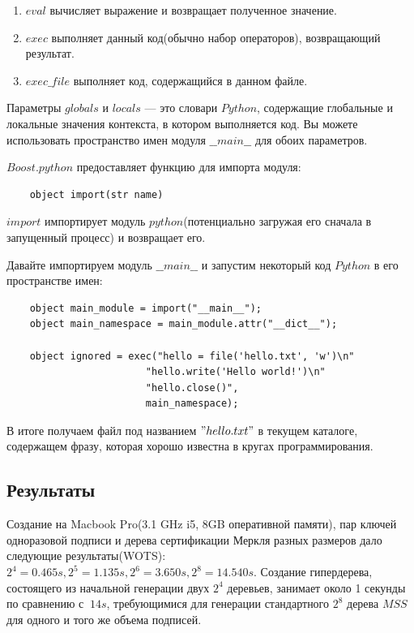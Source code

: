 \documentclass[a4paper, 14pt]{extarticle}
\begin{document}
\begin{enumerate}
    \item $eval$ вычисляет выражение и возвращает полученное значение.
    \item $exec$ выполняет данный код(обычно набор операторов), возвращающий результат.
    \item $exec\_file$ выполняет код, содержащийся в данном файле.
\end{enumerate}

Параметры $globals$ и $locals$ --- это словари $Python$, содержащие глобальные и локальные значения контекста, в котором выполняется код. Вы можете использовать пространство имен модуля $\_\_main\_\_$ для обоих параметров.

$Boost.python$ предоставляет функцию для импорта модуля:
\begin{verbatim}
    object import(str name)
\end{verbatim}

$import$ импортирует модуль $python$(потенциально загружая его сначала в запущенный процесс) и возвращает его.

Давайте импортируем модуль $\_\_main\_\_$ и запустим некоторый код $Python$ в его пространстве имен:

\begin{verbatim}
    object main_module = import("__main__");
    object main_namespace = main_module.attr("__dict__");

    object ignored = exec("hello = file('hello.txt', 'w')\n"
                        "hello.write('Hello world!')\n"
                        "hello.close()",
                        main_namespace);
\end{verbatim}

В итоге получаем файл под названием $"hello.txt"$ в текущем каталоге, содержащем фразу, которая хорошо известна в кругах программирования.

\subsection{Результаты}
Создание на Macbook Pro(3.1 GHz i5, 8GB оперативной памяти), пар ключей одноразовой подписи и дерева сертификации Меркля разных размеров дало следующие результаты(WOTS): $2^4 = 0.465s, 2^5 = 1.135s, 2^6 = 3.650s, 2^8 = 14.540s$. Создание гипердерева, состоящего из начальной генерации двух $2^4$ деревьев, занимает около 1 секунды по сравнению с $~14s$, требующимися для генерации стандартного $2^8$ дерева $MSS$ для одного и того же объема подписей. 
\end{document}
